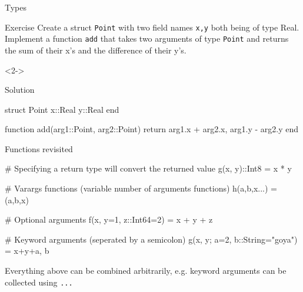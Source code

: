\documentclass{beamer}
\newenvironment{Boxx}{\begin{tcolorbox}[standard jigsaw, opacityframe=0.8, opacityback=0.0]}{\end{tcolorbox}}
\begin{document}
\begin{frame}[fragile]{Types}
	\begin{overlayarea}{\linewidth}{9cm}
	\begin{block}{Exercise}
		Create a struct \verb|Point| with two field names \verb|x,y| both being of type Real. Implement a function \verb|add| that takes two arguments of type \verb|Point| and returns the sum of their x's and the difference of their y's.
	\end{block}
	\vfill
	\begin{onlyenv}<2->
	\begin{block}{Solution}
			\vspace*{1mm}
		\begin{jllisting}
  struct Point
    x::Real
    y::Real
  end
  
  function add(arg1::Point, arg2::Point)
    return arg1.x + arg2.x, arg1.y - arg2.y
  end
		\end{jllisting}
		\vspace*{1mm}
	\end{block}
\end{onlyenv}
\end{overlayarea}
\end{frame}

\begin{frame}[fragile]{Functions revisited}

	\begin{Boxx}
		\begin{jllisting}
  # Specifying a return type will convert the returned value	
  g(x, y)::Int8 = x * y
  
  # Varargs functions (variable number of arguments functions)
  h(a,b,x...) = (a,b,x)
  
  # Optional arguments
  f(x, y=1, z::Int64=2) = x + y + z
  
  # Keyword arguments (seperated by a semicolon)
  g(x, y; a=2, b::String="goya") = x+y+a, b
		\end{jllisting}
	\end{Boxx}
Everything above can be combined arbitrarily, e.g. keyword arguments can be collected using \verb|...|

	
\end{frame}
\end{document}

